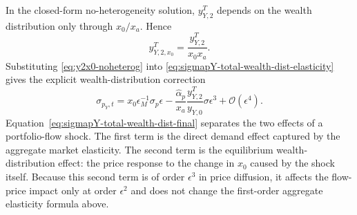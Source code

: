 In the closed-form no-heterogeneity solution, $y_{Y,2}^{T}$ depends on the wealth distribution only through $x_0/x_a$.
Hence
\begin{equation}\label{eq:y2x0-noheterog}
    y_{Y,2,x_0}^{T}
    =\frac{y_{Y,2}^{T}}{x_0x_a}.
\end{equation}
Substituting \eqref{eq:y2x0-noheterog} into \eqref{eq:sigmapY-total-wealth-dist-elasticity} gives the explicit wealth-distribution correction
\begin{equation}\label{eq:sigmapY-total-wealth-dist-final}
    \sigma_{p_Y,t}
    =x_0\epsilon_M^{-1}\sigma_p\epsilon
    -\frac{\hat{\alpha}_p}{x_a}\frac{y_{Y,2}^{T}}{y_{Y,0}}\sigma\epsilon^3
    +\mathcal{O}(\epsilon^4).
\end{equation}
Equation~\eqref{eq:sigmapY-total-wealth-dist-final} separates the two effects of a portfolio-flow shock.
The first term is the direct demand effect captured by the aggregate market elasticity.
The second term is the equilibrium wealth-distribution effect: the price response to the change in $x_0$ caused by the shock itself.
Because this second term is of order $\epsilon^3$ in price diffusion, it affects the flow-price impact only at order $\epsilon^2$ and does not change the first-order aggregate elasticity formula above.






